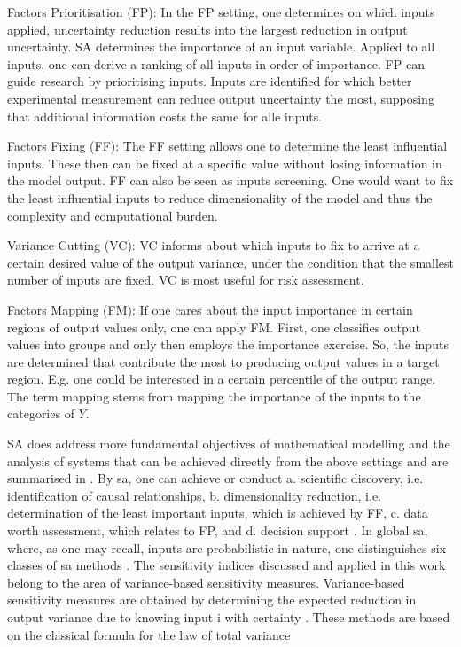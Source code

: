Factors Prioritisation (FP): In the FP setting, one determines on which inputs applied, uncertainty reduction results into the largest reduction in output uncertainty. SA determines the importance of an input variable. Applied to all inputs, one can derive a ranking of all inputs in order of importance. FP can guide research by prioritising inputs. Inputs are identified for which better experimental measurement can reduce output uncertainty the most, supposing that additional information costs the same for alle inputs.

Factors Fixing (FF): The FF setting allows one to determine the least influential inputs. These then can be fixed at a specific value without losing information in the model output. FF can also be seen as inputs screening. One would want to fix the least influential inputs to reduce dimensionality of the model and thus the complexity and computational burden.

Variance Cutting (VC): VC informs about which inputs to fix to arrive at a certain desired value of the output variance, under the condition that the smallest number of inputs are fixed. VC is most useful for risk assessment.

Factors Mapping (FM): If one cares about the input importance in certain regions of output values only, one can apply FM. First, one classifies output values into groups and only then employs the importance exercise. So, the inputs are determined that contribute the most to producing output values in a target region. E.g. one could be interested in a certain percentile of the output range. The term mapping stems from mapping the importance of the inputs to the categories of $Y$.

SA does address more fundamental objectives of mathematical modelling and the analysis of systems that can be achieved directly from the above settings and are summarised in \cite{R21}. By sa, one can achieve or conduct a. scientific discovery, i.e. identification of causal relationships, b. dimensionality reduction, i.e. determination of the least important inputs, which is achieved by FF, c. data worth assessment, which relates to FP, and d. decision support \cite{R21}.
In global sa, where, as one may recall, inputs are probabilistic in nature, one distinguishes six classes of sa methods \cite{BP16}. The sensitivity indices discussed and applied in this work belong to the area of variance-based sensitivity measures. Variance-based sensitivity measures are obtained by determining the expected reduction in output variance due to knowing input i with certainty \cite{BP16}. These methods are based on the classical formula for the law of total variance

